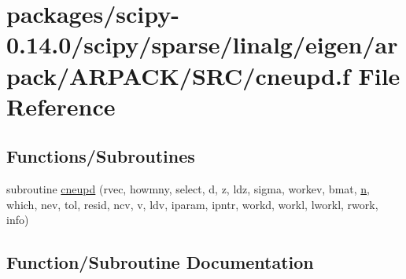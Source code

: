 \hypertarget{cneupd_8f}{}\section{packages/scipy-\/0.14.0/scipy/sparse/linalg/eigen/arpack/\+A\+R\+P\+A\+C\+K/\+S\+R\+C/cneupd.f File Reference}
\label{cneupd_8f}
\subsection*{Functions/\+Subroutines}
\begin{DoxyCompactItemize}
\item 
subroutine \hyperlink{cneupd_8f_af076c9f8e9d92f9fba01f36a0f8e291d}{cneupd} (rvec, howmny, select, d, z, ldz, sigma, workev, bmat, \hyperlink{indexexpr_8h_ab427e2e2b4d6cec55fa088ea2a692ace}{n}, which, nev, tol, resid, ncv, v, ldv, iparam, ipntr, workd, workl, lworkl, rwork, info)
\end{DoxyCompactItemize}


\subsection{Function/\+Subroutine Documentation}
\hypertarget{cneupd_8f_af076c9f8e9d92f9fba01f36a0f8e291d}{}
